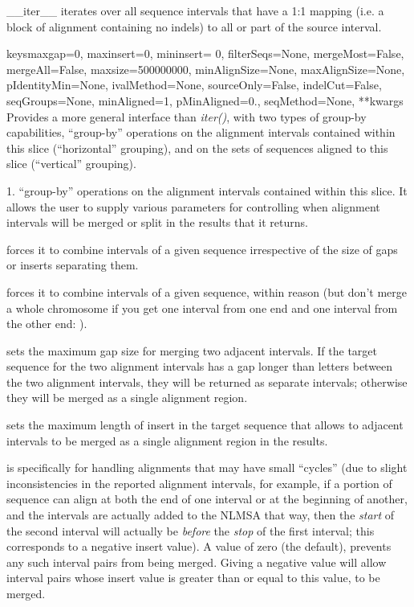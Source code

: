 \documentclass{howto}
\begin{document}
\begin{funcdesc}{__iter__}{}
  iterates over all sequence intervals that have
  a 1:1 mapping (i.e. a block of alignment containing no indels) to
  all or part of the source interval.
\end{funcdesc}


\begin{funcdesc}{keys}{maxgap=0, maxinsert=0, mininsert= 0, filterSeqs=None, mergeMost=False, mergeAll=False, maxsize=500000000, minAlignSize=None, maxAlignSize=None, pIdentityMin=None, ivalMethod=None, sourceOnly=False, indelCut=False, seqGroups=None, minAligned=1, pMinAligned=0., seqMethod=None, **kwargs}
  Provides a more general interface than {\em iter()}, with two types of 
  group-by capabilities, ``group-by'' operations on the alignment intervals
  contained within this slice (``horizontal'' grouping), 
  and on the sets of sequences aligned
  to this slice (``vertical'' grouping).

  1. ``group-by'' operations on the alignment intervals
  contained within this slice.  It allows the user to supply
  various parameters for controlling when alignment intervals will be
  merged or split in the results that it returns.

  forces it to combine intervals of a given sequence irrespective
  of the size of gaps or inserts separating them.

  forces it to combine intervals of a given sequence, within reason
  (but don't merge a whole chromosome if you get one interval from one end
  and one interval from the other end:
  ).

   sets the
  maximum gap size for merging two adjacent intervals.  If the target sequence
  for the two alignment intervals has a gap longer than  
  letters between the two alignment intervals, they will be returned as
  separate intervals; otherwise they will be merged as a single alignment
  region.

   sets the maximum length of insert in the target
  sequence that allows to adjacent intervals to be merged as a single alignment
  region in the results.

   is specifically for handling
  alignments that may have small ``cycles'' (due to slight inconsistencies
  in the reported alignment intervals, for example, if a portion of sequence
  can align at both the end of one interval or at the beginning of another, and
  the intervals are actually added to the NLMSA that way, then the {\em start}
  of the second interval will actually be {\em before} the {\em stop} of 
  the first interval; this corresponds to a negative insert value).  A
   value of zero (the default), prevents any such interval
  pairs from being merged.  Giving a negative  value will allow
  interval pairs whose insert value is greater than or equal to this value, 
  to be merged.


\end{funcdesc}
\end{document}
